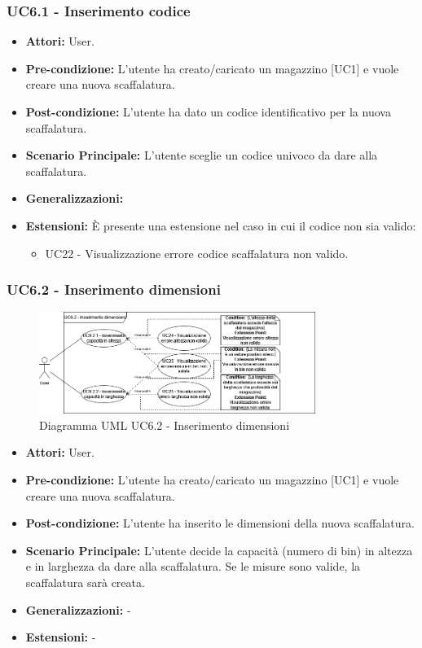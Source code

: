 \subsubsection{UC6.1 - Inserimento codice}
\begin{itemize}
    \item \textbf{Attori:} User.
    \item \textbf{Pre-condizione:}  L'utente ha creato/caricato un magazzino [UC1] e vuole creare una nuova scaffalatura.
    \item \textbf{Post-condizione:} L'utente ha dato un codice identificativo per la nuova scaffalatura.
    \item \textbf{Scenario Principale:}  L'utente sceglie un codice univoco da dare alla scaffalatura.
    \item \textbf{Generalizzazioni:} 
    \item \textbf{Estensioni:} È presente una estensione nel caso in cui il codice non sia valido:
    \begin{itemize}
        \item UC22 - Visualizzazione errore codice scaffalatura non valido.
    \end{itemize}
\end{itemize}


\subsubsection{UC6.2 - Inserimento dimensioni}
\begin{figure}[H]
  \centering
  \includegraphics[width=0.8\textwidth]{UC_diagrams_1-10/UC6.2.drawio.png}
   \caption{Diagramma UML UC6.2 - Inserimento dimensioni}
\end{figure}
\begin{itemize}
    \item \textbf{Attori:} User.
    \item \textbf{Pre-condizione:} L'utente ha creato/caricato un magazzino [UC1] e vuole creare una nuova scaffalatura.
    \item \textbf{Post-condizione:}  L'utente ha inserito le dimensioni della nuova scaffalatura.
    \item \textbf{Scenario Principale:}  L'utente decide la capacità (numero di bin) in altezza e in larghezza da dare alla scaffalatura. Se le misure sono valide, la scaffalatura sarà creata.
    \item \textbf{Generalizzazioni:} -
    \item \textbf{Estensioni:} -
\end{itemize}


